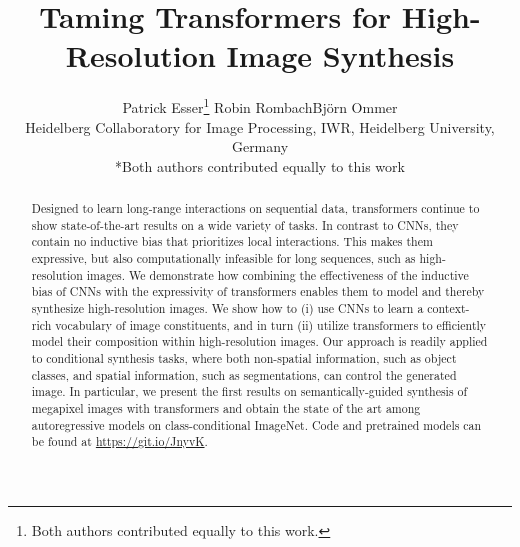\documentclass[final]{cvpr}
\begin{document}
%
%
\title{Taming Transformers for High-Resolution Image Synthesis}
%

\author{Patrick Esser\thanks{Both authors contributed equally to this
work.} \qquad Robin Rombach\footnotemark[1] \qquad Bj\"orn Ommer\\
Heidelberg Collaboratory for Image Processing, IWR, Heidelberg University, Germany\\
\small{*Both authors contributed equally to this work}
}

\twocolumn[{%
\vspace{-2em}
\maketitle%
%
\alaskatop%
}]

%
\begin{abstract}
\noindent Designed to learn long-range interactions on sequential data, transformers
  continue to show state-of-the-art results on a wide variety of tasks.  In
  contrast to CNNs, they contain no inductive bias that prioritizes local
  interactions. This makes them expressive, but also computationally infeasible
  for long sequences, such as high-resolution images. We demonstrate how
  combining the effectiveness of the inductive bias of CNNs with the
  expressivity of transformers enables
  them to model and thereby synthesize high-resolution images.
  We show how to (i) use CNNs to learn a context-rich vocabulary of
  image constituents, and in turn (ii) utilize transformers to efficiently
  model their composition within high-resolution images.
  Our approach is readily applied to conditional synthesis tasks, where both
  non-spatial information, such as object classes, and spatial information,
  such as segmentations, can control the generated image.
  In particular, we present the first results on semantically-guided synthesis
  of megapixel images with transformers and obtain the state of the art among 
  autoregressive models on class-conditional ImageNet. 
  Code and pretrained models can be found at \url{https://git.io/JnyvK}.
\end{abstract}
\vspace{-1em} %

%
\enlargethispage{1\baselineskip}
\end{document}
